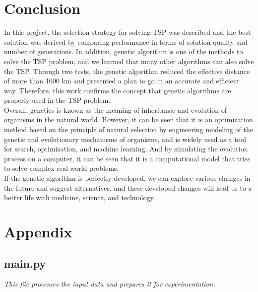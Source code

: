 \documentclass[12pt]{article}
\begin{document}
\section*{Conclusion}
In this project, the selection strategy for solving TSP was described and the best solution was derived by comparing performance in terms of solution quality and number of generations. In addition, genetic algorithm is one of the methods to solve the TSP problem, and we learned that many other algorithms can also solve the TSP. Through two tests, the genetic algorithm reduced the effective distance of more than 1000 km and presented a plan to go in an accurate and efficient way. Therefore, this work confirms the concept that genetic algorithms are properly used in the TSP problem.\\

Overall, genetics is known as the meaning of inheritance and evolution of organisms in the natural world. However, it can be seen that it is an optimization method based on the principle of natural selection by engineering modeling of the genetic and evolutionary mechanisms of organisms, and is widely used as a tool for search, optimization, and machine learning. And by simulating the evolution process on a computer, it can be seen that it is a computational model that tries to solve complex real-world problems.\\

If the genetic algorithm is perfectly developed, we can explore various changes in the future and suggest alternatives, and these developed changes will lead us to a better life with medicine, science, and technology.


            
\newpage


\newpage
\section*{Appendix}
\subsection*{main.py}
    \begin{center}
        \textit{This file processes the input data and prepares it for experimentation.}
    \end{center}
\end{document}
